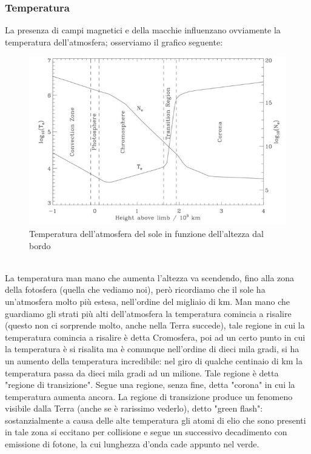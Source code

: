 \documentclass[a4paper,11pt]{article}
\begin{document}
    \subsubsection{Temperatura}
        La presenza di campi magnetici e della macchie influenzano ovviamente la temperatura dell'atmosfera; osserviamo il grafico seguente:
        \\
        \begin{figure}[h!!]
            \centering
                \includegraphics[width=12cm]{2dic/TemperatureAtmosfera.jpg}
                \caption{Temperatura dell'atmosfera del sole in funzione dell'altezza dal bordo}
            \label{fig:Temp}
        \end{figure}
        \\
        La temperatura man mano che aumenta l'altezza va scendendo, fino alla zona della fotosfera (quella che vediamo noi), però ricordiamo che il sole ha un'atmosfera molto più estesa, nell'ordine del migliaio di km.
        Man mano che guardiamo gli strati più alti dell'atmosfera la temperatura comincia a risalire (questo non ci sorprende molto, anche nella Terra succede), tale regione in cui la temperatura comincia a risalire è detta Cromosfera, poi ad un certo punto in cui la temperatura è si risalita ma è comunque nell'ordine di dieci mila gradi, si ha un aumento della temperatura incredibile: nel giro di qualche centinaio di km la temperatura passa da dieci mila gradi ad un milione.
        Tale regione è detta "regione di transizione".
        Segue una regione, senza fine, detta "corona" in cui la temperatura aumenta ancora.
        La regione di transizione produce un fenomeno visibile dalla Terra (anche se è rarissimo vederlo), detto "green flash": sostanzialmente a causa delle alte temperatura gli atomi di elio che sono presenti in tale zona si eccitano per collisione e segue un successivo decadimento con emissione di fotone, la cui lunghezza d'onda cade appunto nel verde.
\end{document}
